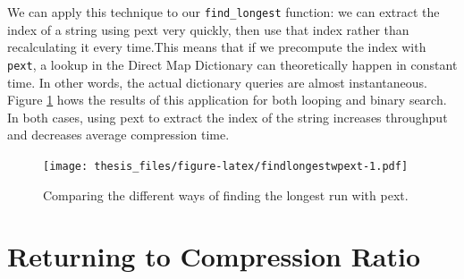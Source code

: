 \documentclass[12pt,twoside]{reedthesis}
\begin{document}
We can apply this technique to our \texttt{find\_longest} function: we can extract the index of a string using pext very quickly, then use that index rather than recalculating it every time.This means that if we precompute the index with \texttt{pext}, a lookup in the Direct Map Dictionary can theoretically happen in constant time. In other words, the actual dictionary queries are almost instantaneous. Figure \ref{fig:findlongestwpext} hows the results of this application for both looping and binary search. In both cases, using pext to extract the index of the string increases throughput and decreases average compression time.
\begin{figure}
\centering
\texttt{[image: thesis\_files/figure-latex/findlongestwpext-1.pdf]}
\caption{\label{fig:findlongestwpext}Comparing the different ways of finding the longest run with pext.}
\end{figure}
\hypertarget{returning-to-compression-ratio}{%
\section{Returning to Compression Ratio}\label{returning-to-compression-ratio}}
\end{document}
